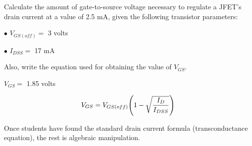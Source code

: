 

Calculate the amount of gate-to-source voltage necessary to regulate a JFET's drain current at a value of 2.5 mA, given the following transistor parameters:

\medskip
\item{$\bullet$} $V_{GS(off)} =$ 3 volts
\item{$\bullet$} $I_{DSS} =$ 17 mA
\medskip

Also, write the equation used for obtaining the value of $V_{GS}$.







$V_{GS} =$ 1.85 volts

$$V_{GS} = V_{GS(off)}\Biggl( 1 - \sqrt{I_D \over I_{DSS}} \Biggr)$$







Once students have found the standard drain current formula (transconductance equation), the rest is algebraic manipulation.




